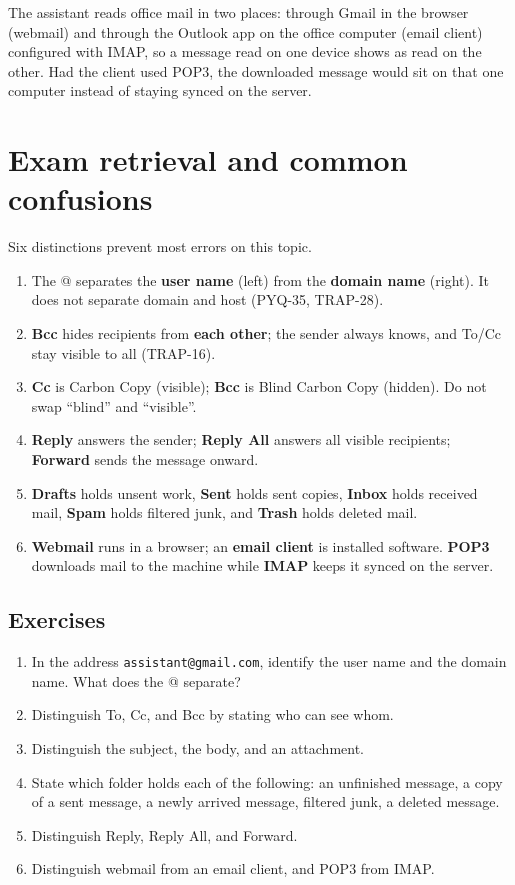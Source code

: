 \begin{example}
The assistant reads office mail in two places: through Gmail in the browser
(webmail) and through the Outlook app on the office computer (email client)
configured with IMAP, so a message read on one device shows as read on the
other. Had the client used POP3, the downloaded message would sit on that one
computer instead of staying synced on the server.
\end{example}

\section{Exam retrieval and common confusions}
Six distinctions prevent most errors on this topic.
\begin{enumerate}
  \item The @ separates the \textbf{user name} (left) from the \textbf{domain
    name} (right). It does not separate domain and host (PYQ-35, TRAP-28).
  \item \textbf{Bcc} hides recipients from \textbf{each other}; the sender
    always knows, and To/Cc stay visible to all (TRAP-16).
  \item \textbf{Cc} is Carbon Copy (visible); \textbf{Bcc} is Blind Carbon Copy
    (hidden). Do not swap ``blind'' and ``visible''.
  \item \textbf{Reply} answers the sender; \textbf{Reply All} answers all
    visible recipients; \textbf{Forward} sends the message onward.
  \item \textbf{Drafts} holds unsent work, \textbf{Sent} holds sent copies,
    \textbf{Inbox} holds received mail, \textbf{Spam} holds filtered junk,
    and \textbf{Trash} holds deleted mail.
  \item \textbf{Webmail} runs in a browser; an \textbf{email client} is
    installed software. \textbf{POP3} downloads mail to the machine while
    \textbf{IMAP} keeps it synced on the server.
\end{enumerate}

\subsection*{Exercises}
\begin{enumerate}[label=\arabic*.]
  \item In the address \texttt{assistant@gmail.com}, identify the user name
    and the domain name. What does the @ separate?
  \item Distinguish To, Cc, and Bcc by stating who can see whom.
  \item Distinguish the subject, the body, and an attachment.
  \item State which folder holds each of the following: an unfinished message,
    a copy of a sent message, a newly arrived message, filtered junk, a
    deleted message.
  \item Distinguish Reply, Reply All, and Forward.
  \item Distinguish webmail from an email client, and POP3 from IMAP.
\end{enumerate}

